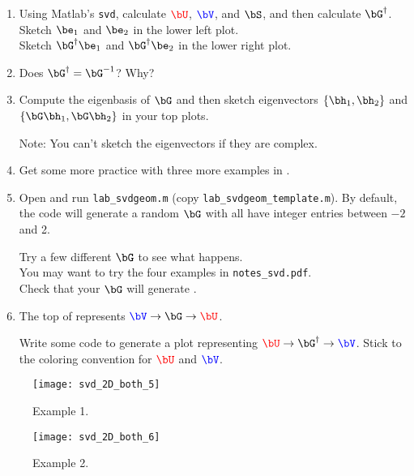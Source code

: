 \documentclass[11pt,titlepage,fleqn]{article}
\begin{document}
\begin{enumerate}
\item Using Matlab's \verb+svd+, calculate $\Ucolor$, $\Vcolor$, and $\bS$, and then calculate $\bG^{\dagger}$. \\
Sketch $\be_1$ and $\be_2$ in the lower left plot. \\
Sketch $\bG^{\dagger}\be_1$ and $\bG^{\dagger}\be_2$ in the lower right plot.

\item Does $\bG^{\dagger} = \bG^{-1}$? Why?

\item Compute the eigenbasis of $\bG$ and then sketch eigenvectors $\{\bh_1,\bh_2\}$ and $\{\bG\bh_1,\bG\bh_2\}$ in your top plots.

Note: You can't sketch the eigenvectors if they are complex.

\item Get some more practice with three more examples in .

\item Open and run \verb+lab_svdgeom.m+ (copy \verb+lab_svdgeom_template.m+). By default, the code will generate a random $\bG$ with all have integer entries between $-2$ and 2.

Try a few different $\bG$ to see what happens. \\
You may want to try the four examples in \verb+notes_svd.pdf+. \\
Check that your $\bG$ will generate .

\item The top of  represents $\Vcolor \rightarrow \bG \rightarrow \Ucolor$.

Write some code to generate a plot representing $\Ucolor \rightarrow \bG^{\dagger} \rightarrow \Vcolor$. Stick to the coloring convention for $\Ucolor$ and $\Vcolor$.

\end{enumerate}



\clearpage\pagebreak
\begin{figure}
\hspace{-1cm}
\texttt{[image: svd\_2D\_both\_5]}
\caption[]
{{
Example 1.
\label{fig:ex1}
}}
\end{figure}

\clearpage\pagebreak
\begin{figure}
\hspace{-1cm}
\texttt{[image: svd\_2D\_both\_6]}
\caption[]
{{
Example 2.
\label{fig:ex2}
}}
\end{figure}
\end{document}
